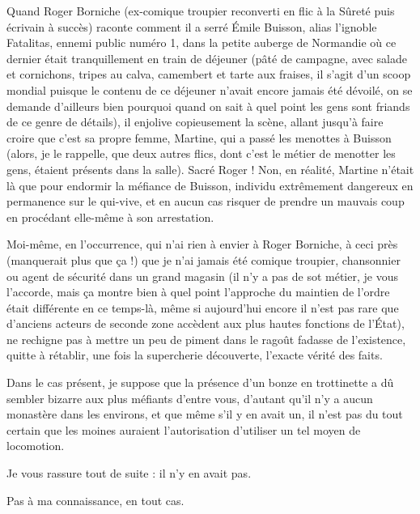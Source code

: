 Quand Roger Borniche (ex-comique troupier reconverti en flic à la Sûreté puis écrivain à succès) raconte comment il a serré Émile Buisson, alias l’ignoble Fatalitas, ennemi public numéro 1, dans la petite auberge de Normandie où ce dernier était tranquillement en train de déjeuner (pâté de campagne, avec salade et cornichons, tripes au calva, camembert et tarte aux fraises, il s’agit d’un scoop mondial puisque le contenu de ce déjeuner n’avait encore jamais été dévoilé, on se demande d’ailleurs bien pourquoi quand on sait à quel point les gens sont friands de ce genre de détails), il enjolive copieusement la scène, allant jusqu’à faire croire que c’est sa propre femme, Martine, qui a passé les menottes à Buisson (alors, je le rappelle, que deux autres flics, dont c’est le métier de menotter les gens, étaient présents dans la salle). Sacré Roger ! Non, en réalité, Martine n’était là que pour endormir la méfiance de Buisson, individu extrêmement dangereux en permanence sur le qui-vive, et en aucun cas risquer de prendre un mauvais coup en procédant elle-même à son arrestation.

Moi-même, en l’occurrence, qui n’ai rien à envier à Roger Borniche, à ceci près (manquerait plus que ça !) que je n’ai jamais été comique troupier, chansonnier ou agent de sécurité dans un grand magasin (il n’y a pas de sot métier, je vous l’accorde, mais ça montre bien à quel point l’approche du maintien de l’ordre était différente en ce temps-là, même si aujourd’hui encore il n’est pas rare que d’anciens acteurs de seconde zone accèdent aux plus hautes fonctions de l’État), ne rechigne pas à mettre un peu de piment dans le ragoût fadasse de l’existence, quitte à rétablir, une fois la supercherie découverte, l’exacte vérité des faits.

Dans le cas présent, je suppose que la présence d’un bonze en trottinette a dû sembler bizarre aux plus méfiants d’entre vous, d’autant qu’il n’y a aucun monastère dans les environs, et que même s’il y en avait un, il n’est pas du tout certain que les moines auraient l’autorisation d’utiliser un tel moyen de locomotion.

Je vous rassure tout de suite : il n’y en avait pas.

Pas à ma connaissance, en tout cas.
